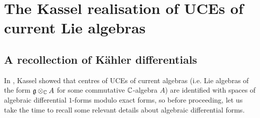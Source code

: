 \section{The Kassel realisation of UCEs of current Lie algebras}
    \subsection{A recollection of K\"ahler differentials}
        In \cite{kassel_universal_central_extensions_of_lie_algebras}, Kassel showed that centres of UCEs of current algebras (i.e. Lie algebras of the form $\g \tensor_{\bbC} A$ for some commutative $\mathbb{C}$-algebra $A$) are identified with spaces of algebraic differential $1$-forms modulo exact forms, so before proceeding, let us take the time to recall some relevant details about algebraic differential forms. 

